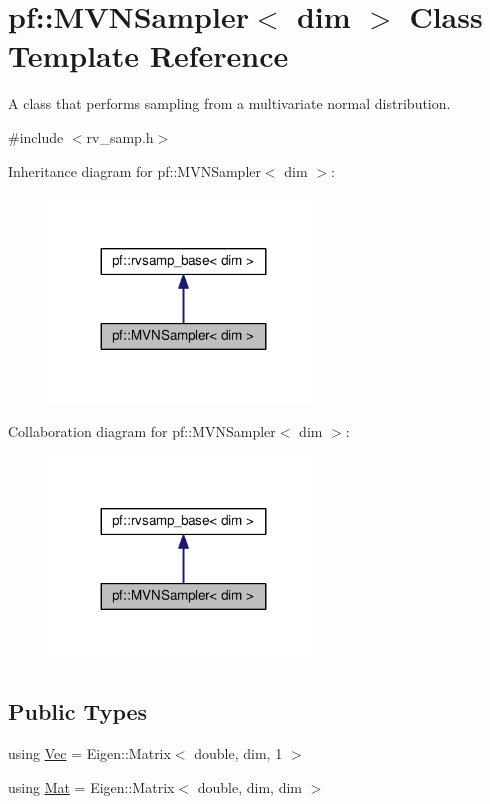\hypertarget{classpf_1_1MVNSampler}{}\section{pf\+:\+:M\+V\+N\+Sampler$<$ dim $>$ Class Template Reference}
\label{classpf_1_1MVNSampler}


A class that performs sampling from a multivariate normal distribution.  




{\ttfamily \#include $<$rv\+\_\+samp.\+h$>$}



Inheritance diagram for pf\+:\+:M\+V\+N\+Sampler$<$ dim $>$\+:\nopagebreak
\begin{figure}[H]
\begin{center}
\leavevmode
\includegraphics[width=203pt]{classpf_1_1MVNSampler__inherit__graph}
\end{center}
\end{figure}


Collaboration diagram for pf\+:\+:M\+V\+N\+Sampler$<$ dim $>$\+:\nopagebreak
\begin{figure}[H]
\begin{center}
\leavevmode
\includegraphics[width=203pt]{classpf_1_1MVNSampler__coll__graph}
\end{center}
\end{figure}
\subsection*{Public Types}
\begin{DoxyCompactItemize}
\item 
using \hyperlink{classpf_1_1MVNSampler_a70fb0813dd4b02e0563512c34079fee3}{Vec} = Eigen\+::\+Matrix$<$ double, dim, 1 $>$
\item 
using \hyperlink{classpf_1_1MVNSampler_a5bd837d18f475be7d0495470b6198a46}{Mat} = Eigen\+::\+Matrix$<$ double, dim, dim $>$
\end{DoxyCompactItemize}
